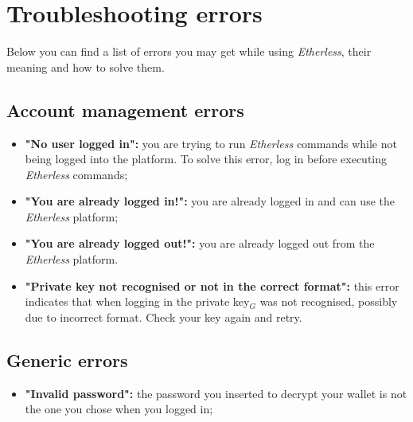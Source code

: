 \section{Troubleshooting errors}
Below you can find a list of errors you may get while using \textit{Etherless}, their meaning and how to solve them.
  \subsection{Account management errors}
    \begin{itemize}
      \item \textbf{"No user logged in":} you are trying to run \textit{Etherless} commands while not being logged into the platform. To solve this error, log in before executing \textit{Etherless} commands;
      \item \textbf{"You are already logged in!":} you are already logged in and can use the \textit{Etherless} platform;
      \item \textbf{"You are already logged out!":} you are already logged out from the \textit{Etherless} platform.
      \item \textbf{"Private key not recognised or not in the correct format":} this error indicates that when logging in the private key$_{G}$ was not recognised, possibly due to incorrect format. Check your key again and retry.
    \end{itemize}
    \subsection{Generic errors}
    \begin{itemize}
    \item \textbf{"Invalid password":} the password you inserted to decrypt your wallet is not the one you chose when you logged in;
    \end{itemize}
